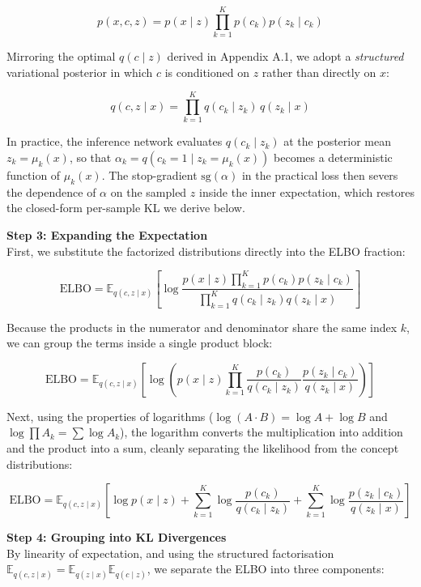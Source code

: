\documentclass[11pt, a4paper]{article}
\begin{document}
\[
p(x, c, z) = p(x \mid z) \prod_{k=1}^K p(c_k) p(z_k \mid c_k)
\]

Mirroring the optimal $q(c \mid z)$ derived in Appendix A.1, we adopt a \emph{structured} variational posterior in which $c$ is conditioned on $z$ rather than directly on $x$:

\[
q(c, z \mid x) = \prod_{k=1}^K q(c_k \mid z_k) \, q(z_k \mid x)
\]

In practice, the inference network evaluates $q(c_k \mid z_k)$ at the posterior mean $z_k = \mu_k(x)$, so that $\alpha_k = q(c_k = 1 \mid z_k = \mu_k(x))$ becomes a deterministic function of $\mu_k(x)$. The stop-gradient $\mathrm{sg}(\alpha)$ in the practical loss then severs the dependence of $\alpha$ on the sampled $z$ inside the inner expectation, which restores the closed-form per-sample KL we derive below.

\textbf{Step 3: Expanding the Expectation}\\
First, we substitute the factorized distributions directly into the ELBO fraction:

\[
\text{ELBO} = \mathbb{E}_{q(c, z \mid x)} \left[ \log \frac{p(x \mid z) \prod_{k=1}^K p(c_k) p(z_k \mid c_k)}{\prod_{k=1}^K q(c_k \mid z_k) q(z_k \mid x)} \right]
\]

Because the products in the numerator and denominator share the same index $k$, we can group the terms inside a single product block:

\[
\text{ELBO} = \mathbb{E}_{q(c, z \mid x)} \left[ \log \left( p(x \mid z) \prod_{k=1}^K \frac{p(c_k)}{q(c_k \mid z_k)} \frac{p(z_k \mid c_k)}{q(z_k \mid x)} \right) \right]
\]

Next, using the properties of logarithms ($\log(A \cdot B) = \log A + \log B$ and $\log \prod A_k = \sum \log A_k$), the logarithm converts the multiplication into addition and the product into a sum, cleanly separating the likelihood from the concept distributions:

\[
\text{ELBO} = \mathbb{E}_{q(c, z \mid x)} \left[ \log p(x \mid z) + \sum_{k=1}^K \log \frac{p(c_k)}{q(c_k \mid z_k)} + \sum_{k=1}^K \log \frac{p(z_k \mid c_k)}{q(z_k \mid x)} \right]
\]

\textbf{Step 4: Grouping into KL Divergences}\\
By linearity of expectation, and using the structured factorisation $\mathbb{E}_{q(c, z \mid x)} = \mathbb{E}_{q(z \mid x)} \mathbb{E}_{q(c \mid z)}$, we separate the ELBO into three components:
\end{document}

